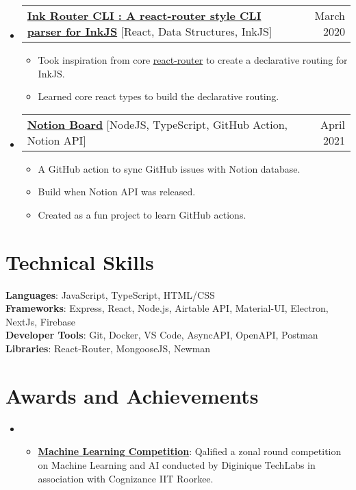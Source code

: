 \documentclass[letterpaper,11pt]{article}
\makeatletter
\newcommand{\resumeItem}[1]{
  \item\small{
    {#1 \vspace{-2pt}}
  }
}
\newcommand{\resumeProjectHeading}[2]{
    \item
    \begin{tabular*}{0.97\textwidth}{l@{\extracolsep{\fill}}r}
      \small#1 & #2 \\
    \end{tabular*}\vspace{-7pt}
}
\newcommand{\resumeSubHeadingListStart}{\begin{itemize}[leftmargin=0.15in, label={}]}
\newcommand{\resumeSubHeadingListEnd}{\end{itemize}}
\newcommand{\resumeItemListStart}{\begin{itemize}}
\newcommand{\resumeItemListEnd}{\end{itemize}\vspace{-5pt}}
\makeatother
\begin{document}
     \resumeSubHeadingListStart
      \resumeProjectHeading
          {\textbf{\href{https://github.com/Souvikns/ink-router-cli}{Ink Router CLI : A react-router style CLI parser for InkJS}} {[React, Data Structures, InkJS]}}{March 2020}
          \resumeItemListStart
            \resumeItem{Took inspiration from core \href{https://github.com/remix-run/react-router}{\underline{react-router}} to create a declarative routing for InkJS. }
            \resumeItem{Learned core react types to build the declarative routing. }
          \resumeItemListEnd
    \resumeSubHeadingListEnd
  \resumeSubHeadingListStart
      \resumeProjectHeading
          {\textbf{\href{https://github.com/Souvikns/notion-board}{\textbf{Notion Board}}}{ [NodeJS, TypeScript, GitHub Action, Notion API]}}{April 2021}
          \resumeItemListStart
            \resumeItem{A GitHub action to sync GitHub issues with Notion database. }
            \resumeItem{Build when Notion API was released. }
            \resumeItem{Created as a fun project to learn GitHub actions.}
          \resumeItemListEnd
    \resumeSubHeadingListEnd


%
\section{Technical Skills}
 \begin{itemize}[leftmargin=0.15in, label={}]
    \small{\item{
     \textbf{Languages}{: JavaScript, TypeScript, HTML/CSS} \\
     \textbf{Frameworks}{: Express, React, Node.js, Airtable API, Material-UI, Electron, NextJs, Firebase  } \\
     \textbf{Developer Tools}{: Git, Docker, VS Code, AsyncAPI, OpenAPI, Postman} \\
     \textbf{Libraries}{: React-Router, MongooseJS, Newman }
    }}
 \end{itemize}


\section{Awards and Achievements}
 \begin{itemize}[leftmargin=0.15in, label={}]
    \small\item{\resumeItemListStart
           \resumeItem{\textbf{\href{https://drive.google.com/file/d/1NjTX2drZ3M4xpm8oKZ7bV4YLU-jEU3fY/view?usp=sharing}{Machine Learning Competition}}: Qalified a zonal round competition on Machine Learning and AI conducted by Diginique TechLabs in association with Cognizance IIT Roorkee. }
      \resumeItemListEnd
    }
 \end{itemize}
 
\end{document}

